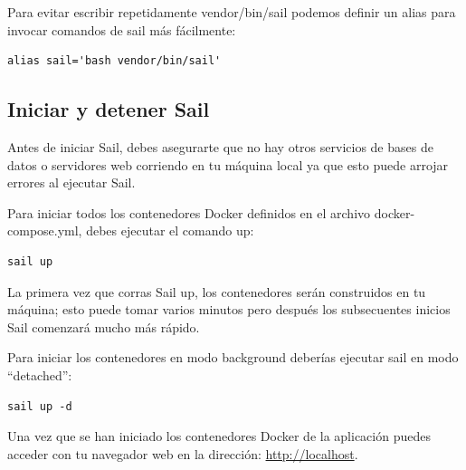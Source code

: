 \documentclass[11pt]{article}
\begin{document}
Para evitar escribir repetidamente vendor/bin/sail podemos definir un
alias para invocar comandos de sail más fácilmente:
\begin{verbatim}
alias sail='bash vendor/bin/sail'
\end{verbatim}

\subsection{Iniciar y detener Sail}
\label{sec:orgc0ac836}
Antes de iniciar Sail, debes asegurarte que no hay otros servicios de
bases de datos o servidores web corriendo en tu máquina local ya que
esto puede arrojar errores al ejecutar Sail.

Para iniciar todos los contenedores Docker definidos en el archivo
docker-compose.yml, debes ejecutar el comando up:
\begin{verbatim}
sail up
\end{verbatim}

La primera vez que corras Sail up, los contenedores serán construidos
en tu máquina; esto puede tomar varios minutos pero después los
subsecuentes inicios Sail comenzará mucho más rápido.

Para iniciar los contenedores en modo background deberías ejecutar
sail en modo “detached”:
\begin{verbatim}
sail up -d
\end{verbatim}

Una vez que se han iniciado los contenedores Docker de la aplicación
puedes acceder con tu navegador web en la dirección: \url{http://localhost}.
\end{document}
